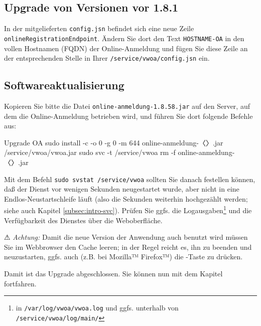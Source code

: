 \documentclass{tarentanleitung}
\newcommand{\vwiaverssw}{1.8.58}
\begin{document}
\subsection{Upgrade von Versionen vor 1.8.1}\label{subsec:upgrade-oa-181}

In der mitgelieferten \texttt{config.jsn} befindet sich eine neue
Zeile \texttt{onlineRegistrationEndpoint}. Ändern Sie dort den Text
\texttt{HOSTNAME-OA} in den vollen Hostnamen (FQDN) der Online-Anmeldung
und fügen Sie diese Zeile an der entsprechenden Stelle in Ihrer
\texttt{/service/vwoa/config.jsn} ein.

\subsection{Softwareaktualisierung}\label{subsec:upgrade-oa-software}

\begin{minipage}{\linewidth}
Kopieren Sie bitte die Datei \texttt{online-anmeldung-\vwiaverssw{}.jar}
auf den Server, auf dem die Online-Anmeldung betrieben wird, und führen
Sie dort folgende Befehle aus:

\begin{lstdump}{Upgrade OA}
sudo install -c -o 0 -g 0 -m 644 online-anmeldung-〈\lstdumpesc{\vwiaverssw}〉.jar /service/vwoa/vwoa.jar
sudo svc -t /service/vwoa
rm -f online-anmeldung-〈\lstdumpesc{\vwiaverssw}〉.jar
\end{lstdump}
\end{minipage}

Mit dem Befehl \texttt{sudo svstat /service/vwoa} sollten Sie
danach festellen können, daß der Dienst vor wenigen Sekunden
neugestartet wurde, aber nicht in eine Endlos-Neustartschleife
läuft (also die Sekunden weiterhin hochgezählt werden; siehe
auch Kapitel \ref{subsec:intro-svc}). Prüfen Sie ggfs. die
Logausgaben\Hair\footnote{\label{fn:vwoalogs}in
\texttt{/var/log/vwoa/vwoa.log} und ggfs. unterhalb von
\texttt{/service/vwoa/log/main/}} und die Verfügbarkeit des
Dienstes über die Weboberfläche.

⚠ \emph{Achtung:} Damit die neue Version der Anwendung auch
benutzt wird müssen Sie im Webbrowser den Cache leeren; in
der Regel reicht es, ihn zu beenden und neuzustarten, ggfs.
auch (z.B. bei Mozilla™ Firefox™) die -Taste
zu drücken.

\fi%

Damit ist das Upgrade abgeschlossen.
Sie können nun mit dem Kapitel  fortfahren.
\end{document}
